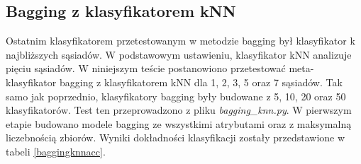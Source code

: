 \subsection{Bagging z klasyfikatorem kNN}
Ostatnim klasyfikatorem przetestowanym w metodzie bagging był klasyfikator k najbliższych sąsiadów. W podstawowym ustawieniu, klasyfikator kNN analizuje pięciu sąsiadów. W niniejszym teście postanowiono przetestować meta-klasyfikator bagging z klasyfikatorem kNN dla 1, 2, 3, 5 oraz 7 sąsiadów. Tak samo jak poprzednio, klasyfikatory bagging były budowane z 5, 10, 20 oraz 50 klasyfikatorów. Test ten przeprowadzono z pliku \textit{bagging\_knn.py}. W pierwszym etapie budowano modele bagging ze wszystkimi atrybutami oraz z maksymalną liczebnością zbiorów. Wyniki dokładności klasyfikacji zostały przedstawione w tabeli \ref{baggingknnacc}. 
\begin{table}[H]
	\tiny
	\begin{center}
\end{center}
\end{table}
